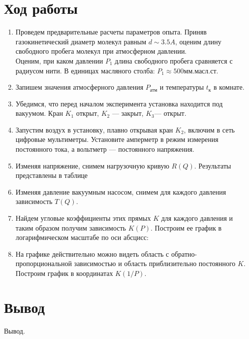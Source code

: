 \documentclass[12pt]{article}
\begin{document}
    \section{Ход работы}
        \begin{enumerate}
            \item Проведем предварительные расчеты параметров опыта. Приняв газокинетический диаметр молекул равным $d \sim 3.5 A$, оценим
            длину свободного пробега молекул при атмосферном давлении.\\
            Оценим, при каком давлении $P_1$ длина свободного пробега сравняется с радиусом нити. В единицах масляного столба: $P_1 \approx 500 \text{мм.масл.ст.}$
            \item Запишем значения атмосферного давления $P_{\text{атм}}$ и температуры $t_{\text{к}}$ в комнате.
            \item Убедимся, что перед началом эксперимента установка находится под вакуумом. Кран $K_1$ открыт, $K_2$ — закрыт, $K_3$— открыт.
            \item Запустим воздух в установку, плавно открывая кран $K_2$, включим в сеть цифровые мультиметры. Установите амперметр в режим
            измерения постоянного тока, а вольтметр — постоянного напряжения.
            \item Изменяя напряжение, снимем нагрузочную кривую $R(Q)$. Результаты представлены в
            таблице

            \item Изменяя давление вакуумным насосом, снимем для каждого давления
            зависимость $T(Q)$.


            \item Найдем угловые коэффициенты этих прямых $K$ для каждого давления
            и таким образом получим зависимость $K(P)$. Построим ее график в логарифмическом масштабе
            по оси абсцисс:

            \item На графике действительно можно видеть область с обратно-пропорциональной зависимостью и
            область приблизительно постоянного $K$. Построим график в координатах $K(1/P)$.

        \end{enumerate}
    \section{Вывод}
    Вывод.
\end{document}
